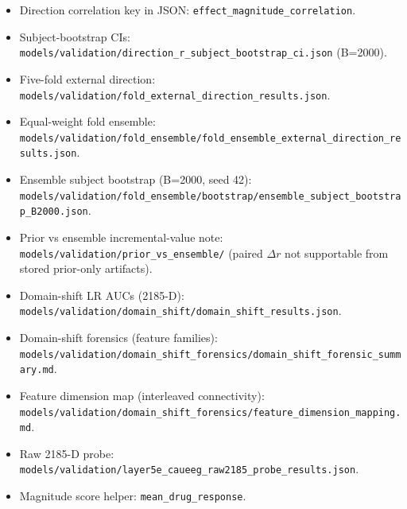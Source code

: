\begin{itemize}
  \item Direction correlation key in JSON: \texttt{effect\_\allowbreak{}magnitude\_\allowbreak{}correlation}.
  \item Subject-bootstrap CIs: \texttt{models/\allowbreak{}validation/\allowbreak{}direction\_\allowbreak{}r\_\allowbreak{}subject\_\allowbreak{}bootstrap\_\allowbreak{}ci.\allowbreak{}json} (B=2000).
  \item Five-fold external direction: \texttt{models/\allowbreak{}validation/\allowbreak{}fold\_\allowbreak{}external\_\allowbreak{}direction\_\allowbreak{}results.\allowbreak{}json}.
  \item Equal-weight fold ensemble: \texttt{models/\allowbreak{}validation/\allowbreak{}fold\_\allowbreak{}ensemble/\allowbreak{}fold\_\allowbreak{}ensemble\_\allowbreak{}external\_\allowbreak{}direction\_\allowbreak{}results.\allowbreak{}json}.
  \item Ensemble subject bootstrap (B=2000, seed 42): \texttt{models/\allowbreak{}validation/\allowbreak{}fold\_\allowbreak{}ensemble/\allowbreak{}bootstrap/\allowbreak{}ensemble\_\allowbreak{}subject\_\allowbreak{}bootstrap\_\allowbreak{}B2000.\allowbreak{}json}.
  \item Prior vs ensemble incremental-value note: \texttt{models/\allowbreak{}validation/\allowbreak{}prior\_\allowbreak{}vs\_\allowbreak{}ensemble/\allowbreak{}} (paired \(\Delta r\) not supportable from stored prior-only artifacts).
  \item Domain-shift LR AUCs (2185-D): \texttt{models/\allowbreak{}validation/\allowbreak{}domain\_\allowbreak{}shift/\allowbreak{}domain\_\allowbreak{}shift\_\allowbreak{}results.\allowbreak{}json}.
  \item Domain-shift forensics (feature families): \texttt{models/\allowbreak{}validation/\allowbreak{}domain\_\allowbreak{}shift\_\allowbreak{}forensics/\allowbreak{}domain\_\allowbreak{}shift\_\allowbreak{}forensic\_\allowbreak{}summary.\allowbreak{}md}.
  \item Feature dimension map (interleaved connectivity): \texttt{models/\allowbreak{}validation/\allowbreak{}domain\_\allowbreak{}shift\_\allowbreak{}forensics/\allowbreak{}feature\_\allowbreak{}dimension\_\allowbreak{}mapping.\allowbreak{}md}.
  \item Raw 2185-D probe: \texttt{models/\allowbreak{}validation/\allowbreak{}layer5e\_\allowbreak{}caueeg\_\allowbreak{}raw2185\_\allowbreak{}probe\_\allowbreak{}results.\allowbreak{}json}.
  \item Magnitude score helper: \texttt{mean\_\allowbreak{}drug\_\allowbreak{}response}.

\end{itemize}

